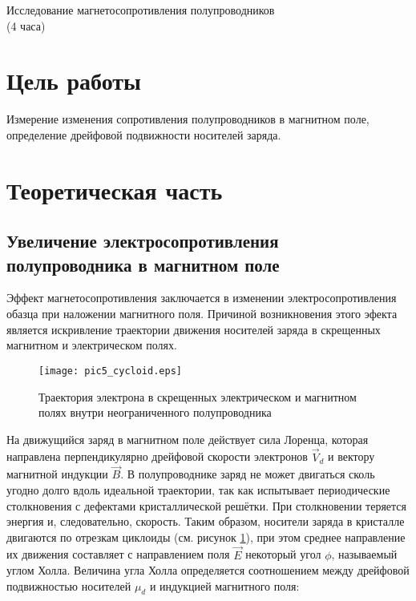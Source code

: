 \newpage

\setcounter{chapter}{5}

\begin{center}
Исследование магнетосопротивления полупроводников\\
(4 часа)
\end{center}

\section{Цель работы}
Измерение изменения сопротивления полупроводников в магнитном поле, определение дрейфовой подвижности носителей заряда.

\section{Теоретическая часть}

\subsection{Увеличение электросопротивления полупроводника в магнитном поле}

Эффект магнетосопротивления заключается в изменении электросопротивления обазца при наложении магнитного поля. Причиной возникновения этого эфекта является искривление траектории движения носителей заряда в скрещенных магнитном и электрическом полях.

\begin{figure}[h!]\centering
\texttt{[image: pic5\_cycloid.eps]}
\caption{Траектория электрона в скрещенных электрическом и магнитном полях внутри неограниченного полупроводника}
\label{pic5_cycloid}
\end{figure}

На движущийся заряд в магнитном поле действует сила Лоренца, которая направлена перпендикулярно дрейфовой скорости электронов $\overrightarrow{V}_{d}$ и вектору магнитной индукции $\overrightarrow{B}$. В полупроводнике заряд не может двигаться сколь угодно долго вдоль идеальной траектории, так как испытывает периодические столкновения с дефектами кристаллической решётки. При столкновении теряется энергия и, следовательно, скорость. Таким образом, носители заряда в кристалле двигаются по отрезкам циклоиды (см. рисунок \ref{pic5_cycloid}), при этом среднее направление их движения составляет с направлением поля $\overrightarrow{E}$ некоторый угол $\phi$, называемый углом Холла. Величина угла Холла определяется соотношением между дрейфовой подвижностью носителей $\mu_{d} $ и индукцией магнитного поля:

